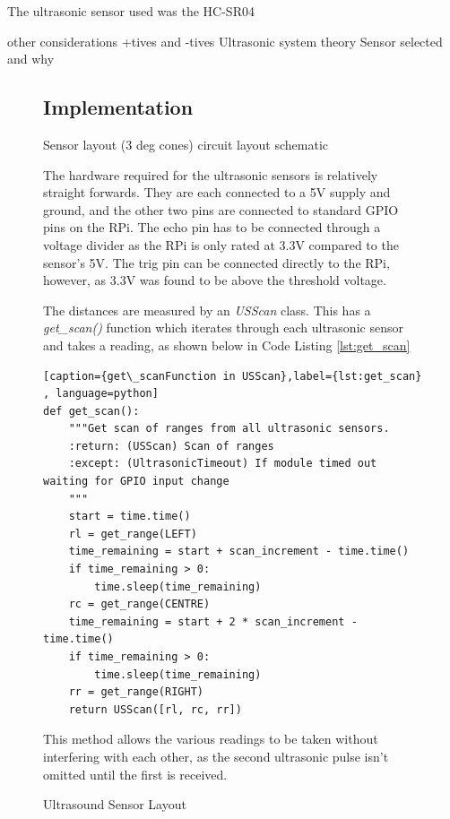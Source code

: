 The ultrasonic sensor used was the HC-SR04

other considerations +tives and -tives
Ultrasonic system theory
Sensor selected and why



\begin{figure}[!ht]
	\centering
	\caption{Ultrasound Sensor Layout}\label{UltraSoundSensorDiagram}

\subsection{Implementation}\label{elec/range/impl}
Sensor layout (3 deg cones) 
circuit layout
schematic

The hardware required for the ultrasonic sensors is relatively straight forwards. They are each connected to a 5V supply and ground, and the other two pins are connected to standard GPIO pins on the RPi. The echo pin has to be connected through a voltage divider as the RPi is only rated at 3.3V compared to the sensor's 5V. The trig pin can be connected directly to the RPi, however, as 3.3V was found to be above the threshold voltage.

The distances are measured by an \textit{USScan} class. This has a \textit{get\_scan()} function which iterates through each ultrasonic sensor and takes a reading, as shown below in Code Listing \ref{lst:get_scan}

\begin{lstlisting}[caption={get\_scanFunction in USScan},label={lst:get_scan} , language=python]
def get_scan():
    """Get scan of ranges from all ultrasonic sensors.
    :return: (USScan) Scan of ranges
    :except: (UltrasonicTimeout) If module timed out waiting for GPIO input change
    """
    start = time.time()
    rl = get_range(LEFT)
    time_remaining = start + scan_increment - time.time()
    if time_remaining > 0:
        time.sleep(time_remaining)
    rc = get_range(CENTRE)
    time_remaining = start + 2 * scan_increment - time.time()
    if time_remaining > 0:
        time.sleep(time_remaining)
    rr = get_range(RIGHT)
    return USScan([rl, rc, rr])
\end{lstlisting}

This method allows the various readings to be taken without interfering with each other, as the second ultrasonic pulse isn't omitted until the first is received. 


\end{figure}
